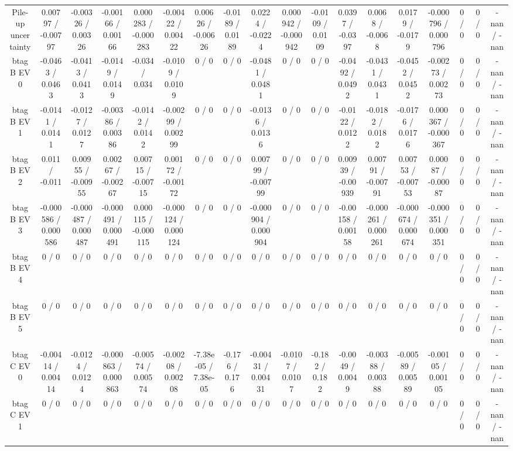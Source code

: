 \documentclass[10pt]{article}
\begin{document}
\begin{table}[htbp]
\begin{center}
\begin{tabular}{|c|c|c|c|c|c|c|c|c|c|c|c|c|c|c|c|c|c|}
  Pile-up uncertainty & 0.00797 / -0.00797 & -0.00326 / 0.00326 & -0.00166 / 0.00166 & 0.000283 / -0.000283 & -0.00422 / 0.00422 & 0.00626 / -0.00626 & -0.0189 / 0.0189 & 0.0224 / -0.0224 & 0.000942 / -0.000942 & -0.0109 / 0.0109 & 0.0397 / -0.0397 & 0.0068 / -0.0068 & 0.0179 / -0.0179 & -0.000796 / 0.000796 & 0 / 0 & 0 / 0 & -nan / -nan \\ 
  btag B EV 0 & -0.0463 / 0.0463 & -0.0413 / 0.0413 & -0.0149 / 0.0149 & -0.034 / 0.034 & -0.0109 / 0.0109 & 0 / 0 & 0 / 0 & -0.0481 / 0.0481 & 0 / 0 & 0 / 0 & -0.0492 / 0.0492 & -0.0431 / 0.0431 & -0.0452 / 0.0452 & -0.00273 / 0.00273 & 0 / 0 & 0 / 0 & -nan / -nan \\ 
  btag B EV 1 & -0.0141 / 0.0141 & -0.0127 / 0.0127 & -0.00386 / 0.00386 & -0.0142 / 0.0142 & -0.00299 / 0.00299 & 0 / 0 & 0 / 0 & -0.0136 / 0.0136 & 0 / 0 & 0 / 0 & -0.0122 / 0.0122 & -0.0182 / 0.0182 & -0.0176 / 0.0176 & 0.000367 / -0.000367 & 0 / 0 & 0 / 0 & -nan / -nan \\ 
  btag B EV 2 & 0.011 / -0.011 & 0.00955 / -0.00955 & 0.00267 / -0.00267 & 0.00715 / -0.00715 & 0.00172 / -0.00172 & 0 / 0 & 0 / 0 & 0.00799 / -0.00799 & 0 / 0 & 0 / 0 & 0.00939 / -0.00939 & 0.00791 / -0.00791 & 0.00753 / -0.00753 & 0.00087 / -0.00087 & 0 / 0 & 0 / 0 & -nan / -nan \\ 
  btag B EV 3 & -0.000586 / 0.000586 & -0.000487 / 0.000487 & -0.000491 / 0.000491 & 0.000115 / -0.000115 & -0.000124 / 0.000124 & 0 / 0 & 0 / 0 & -0.000904 / 0.000904 & 0 / 0 & 0 / 0 & -0.00158 / 0.00158 & -0.000261 / 0.000261 & -0.000674 / 0.000674 & -0.000351 / 0.000351 & 0 / 0 & 0 / 0 & -nan / -nan \\ 
  btag B EV 4 & 0 / 0 & 0 / 0 & 0 / 0 & 0 / 0 & 0 / 0 & 0 / 0 & 0 / 0 & 0 / 0 & 0 / 0 & 0 / 0 & 0 / 0 & 0 / 0 & 0 / 0 & 0 / 0 & 0 / 0 & 0 / 0 & -nan / -nan \\ 
  btag B EV 5 & 0 / 0 & 0 / 0 & 0 / 0 & 0 / 0 & 0 / 0 & 0 / 0 & 0 / 0 & 0 / 0 & 0 / 0 & 0 / 0 & 0 / 0 & 0 / 0 & 0 / 0 & 0 / 0 & 0 / 0 & 0 / 0 & -nan / -nan \\ 
  btag C EV 0 & -0.00414 / 0.00414 & -0.0124 / 0.0124 & -0.000863 / 0.000863 & -0.00574 / 0.00574 & -0.00208 / 0.00208 & -7.38e-05 / 7.38e-05 & -0.176 / 0.176 & -0.00431 / 0.00431 & -0.0107 / 0.0107 & -0.182 / 0.182 & -0.0049 / 0.0049 & -0.00388 / 0.00388 & -0.00589 / 0.00589 & -0.00105 / 0.00105 & 0 / 0 & 0 / 0 & -nan / -nan \\ 
  btag C EV 1 & 0 / 0 & 0 / 0 & 0 / 0 & 0 / 0 & 0 / 0 & 0 / 0 & 0 / 0 & 0 / 0 & 0 / 0 & 0 / 0 & 0 / 0 & 0 / 0 & 0 / 0 & 0 / 0 & 0 / 0 & 0 / 0 & -nan / -nan \\ 

\end{tabular}
\end{center}
\end{table}
\end{document}
